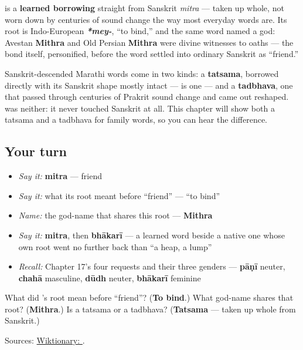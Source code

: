 \begin{cousinweb}
\textbf{} is a \textbf{learned borrowing} straight from Sanskrit \textbf{} \emph{mitra} — taken up whole, not worn down by centuries of sound change the way most everyday words are. Its root is Indo-European \emph{\textbf{*mey-}}, \textquotedblleft{}to bind,\textquotedblright{} and the same word named a god: Avestan \textbf{Mithra} and Old Persian \textbf{Mithra} were divine witnesses to oaths — the bond itself, personified, before the word settled into ordinary Sanskrit as \textquotedblleft{}friend.\textquotedblright{}
\end{cousinweb}

\begin{grammarlens}[title={Grammar Lens: taken up whole, not worn down}]
Sanskrit-descended Marathi words come in two kinds: a \textbf{tatsama}, borrowed directly with its Sanskrit shape mostly intact — \textbf{} is one — and a \textbf{tadbhava}, one that passed through centuries of Prakrit sound change and came out reshaped. \textbf{} was neither: it never touched Sanskrit at all. This chapter will show both a tatsama and a tadbhava for family words, so you can hear the difference.
\end{grammarlens}

\subsection*{Your turn}
\begin{itemize}
\raggedright
  \item \emph{Say it:} \textbf{mitra} — friend
  \item \emph{Say it:} what its root meant before \textquotedblleft{}friend\textquotedblright{} — \textquotedblleft{}to bind\textquotedblright{}
  \item \emph{Name:} the god-name that shares this root — \textbf{Mithra}
  \item \emph{Say it:} \textbf{mitra}, then \textbf{bhākarī} — a learned word beside a native one whose own root went no further back than \textquotedblleft{}a heap, a lump\textquotedblright{}
  \item \emph{Recall:} Chapter 17's four requests and their three genders — \textbf{pāṇī} neuter, \textbf{chahā} masculine, \textbf{dūdh} neuter, \textbf{bhākarī} feminine
\end{itemize}

\begin{tcolorbox}[breakable,colback=teal!4,colframe=teal!35!black,title={Before you move on}]
What did \textbf{}'s root mean before \textquotedblleft{}friend\textquotedblright{}? (\textbf{To bind}.) What god-name shares that root? (\textbf{Mithra}.) Is \textbf{} a tatsama or a tadbhava? (\textbf{Tatsama} — taken up whole from Sanskrit.)

Sources: \href{https://en.wiktionary.org/wiki/\%E0\%A4\%AE\%E0\%A4\%BF\%E0\%A4\%A4\%E0\%A5\%8D\%E0\%A4\%B0}{Wiktionary: }.
\end{tcolorbox}
